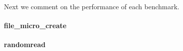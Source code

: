 Next we comment on the performance of each benchmark.

\paragraph{\bf file\_micro\_create}
\paragraph{\bf randomread} 




